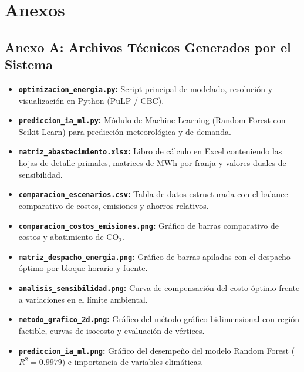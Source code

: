 \documentclass[11pt,a4paper]{article}
\begin{document}
\section{Anexos}

\subsection{Anexo A: Archivos Técnicos Generados por el Sistema}
\begin{itemize}
    \item \textbf{\texttt{optimizacion\_energia.py}:} Script principal de modelado, resolución y visualización en Python (PuLP / CBC).
    \item \textbf{\texttt{prediccion\_ia\_ml.py}:} Módulo de Machine Learning (Random Forest con Scikit-Learn) para predicción meteorológica y de demanda.
    \item \textbf{\texttt{matriz\_abastecimiento.xlsx}:} Libro de cálculo en Excel conteniendo las hojas de detalle primales, matrices de MWh por franja y valores duales de sensibilidad.
    \item \textbf{\texttt{comparacion\_escenarios.csv}:} Tabla de datos estructurada con el balance comparativo de costos, emisiones y ahorros relativos.
    \item \textbf{\texttt{comparacion\_costos\_emisiones.png}:} Gráfico de barras comparativo de costos y abatimiento de $\text{CO}_2$.
    \item \textbf{\texttt{matriz\_despacho\_energia.png}:} Gráfico de barras apiladas con el despacho óptimo por bloque horario y fuente.
    \item \textbf{\texttt{analisis\_sensibilidad.png}:} Curva de compensación del costo óptimo frente a variaciones en el límite ambiental.
    \item \textbf{\texttt{metodo\_grafico\_2d.png}:} Gráfico del método gráfico bidimensional con región factible, curvas de isocosto y evaluación de vértices.
    \item \textbf{\texttt{prediccion\_ia\_ml.png}:} Gráfico del desempeño del modelo Random Forest ($R^2=0.9979$) e importancia de variables climáticas.
\end{itemize}
\end{document}
